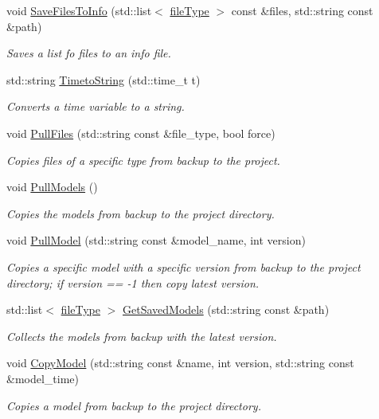 \begin{DoxyCompactItemize}
void \mbox{\hyperlink{namespacemlm_a5cf15b46d858778a1cfcc8905de90782}{Save\+Files\+To\+Info}} (std\+::list$<$ \mbox{\hyperlink{structmlm_1_1fileType}{file\+Type}} $>$ const \&files, std\+::string const \&path)
\begin{DoxyCompactList}\small\item\em Saves a list fo files to an info file. \end{DoxyCompactList}\item 
std\+::string \mbox{\hyperlink{namespacemlm_ad0f07225bafd56dec9570f2b18a2cc0b}{Timeto\+String}} (std\+::time\+\_\+t t)
\begin{DoxyCompactList}\small\item\em Converts a time variable to a string. \end{DoxyCompactList}\item 
void \mbox{\hyperlink{namespacemlm_adefd2b740c344e138a4615c47ac3bea4}{Pull\+Files}} (std\+::string const \&file\+\_\+type, bool force)
\begin{DoxyCompactList}\small\item\em Copies files of a specific type from backup to the project. \end{DoxyCompactList}\item 
\mbox{\label{namespacemlm_acbfaeb431d552dbb5b38cdf35f3c4e1e}} 
void \mbox{\hyperlink{namespacemlm_acbfaeb431d552dbb5b38cdf35f3c4e1e}{Pull\+Models}} ()
\begin{DoxyCompactList}\small\item\em Copies the models from backup to the project directory. \end{DoxyCompactList}\item 
void \mbox{\hyperlink{namespacemlm_a5075bf9f5df7e45da6fd00e0927a2996}{Pull\+Model}} (std\+::string const \&model\+\_\+name, int version)
\begin{DoxyCompactList}\small\item\em Copies a specific model with a specific version from backup to the project directory; if version == -\/1 then copy latest version. \end{DoxyCompactList}\item 
std\+::list$<$ \mbox{\hyperlink{structmlm_1_1fileType}{file\+Type}} $>$ \mbox{\hyperlink{namespacemlm_a7e5335d56536117373d3d70d7bee0aca}{Get\+Saved\+Models}} (std\+::string const \&path)
\begin{DoxyCompactList}\small\item\em Collects the models from backup with the latest version. \end{DoxyCompactList}\item 
void \mbox{\hyperlink{namespacemlm_a031e4e0f6aef23eece0cba1c69811212}{Copy\+Model}} (std\+::string const \&name, int version, std\+::string const \&model\+\_\+time)
\begin{DoxyCompactList}\small\item\em Copies a model from backup to the project directory. \end{DoxyCompactList}\end{DoxyCompactItemize}
